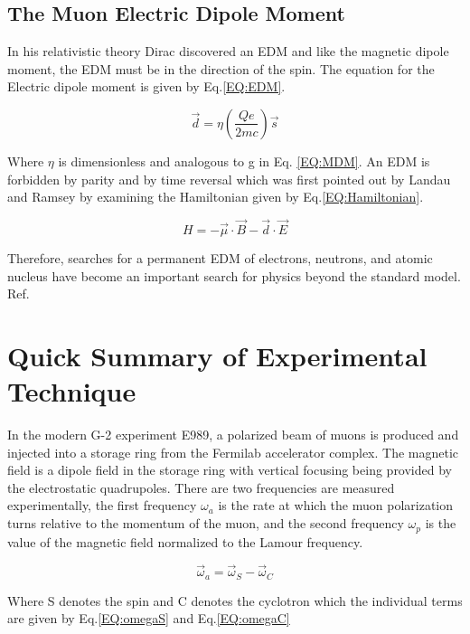 \documentclass[./Thesis]{subfiles}
\begin{document}
\subsection{The Muon Electric Dipole Moment}

	In his relativistic theory Dirac discovered an EDM and like the magnetic dipole moment, the EDM must be in the direction of the spin.  The equation for the Electric dipole moment is given by Eq.\ref{EQ:EDM}.
	
	\begin{equation}\label{EQ:EDM}
		\vec{d} = \eta (\frac{Qe}{2mc}) \vec{s}
	\end{equation}

	Where $\eta$ is dimensionless and analogous to g in Eq. \ref{EQ:MDM}.  An EDM is forbidden by parity and by time reversal which was first pointed out by Landau and Ramsey by examining the Hamiltonian given by Eq.\ref{EQ:Hamiltonian}. \cite{Landau}
	
	\begin{equation}\label{EQ:Hamiltonian}
	H = -\vec{\mu} \cdot \vec{B} - \vec{d} \cdot \vec{E}
	\end{equation}
	
Therefore, searches for a permanent EDM of electrons, neutrons, and atomic nucleus have become an important search for physics beyond the standard model.  Ref.\cite{TDR}

\section{Quick Summary of Experimental Technique}

	In the modern G-2 experiment E989, a polarized beam of muons is produced and injected into a storage ring from the Fermilab accelerator complex.  The magnetic field is a dipole field in the storage ring with vertical focusing being provided by the electrostatic quadrupoles.  There are two frequencies are measured experimentally, the first frequency $\omega_{a}$ is the rate at which the muon polarization turns relative to the momentum of the muon, and the second frequency $\omega_p$ is the value of the magnetic field normalized to the Lamour frequency.
	
	\begin{equation}
	\vec{\omega}_{a} = \vec{\omega}_{S} - \vec{\omega}_{C}
	\end{equation}

Where S denotes the spin and C denotes the cyclotron which the individual terms are given by Eq.\ref{EQ:omegaS} and Eq.\ref{EQ:omegaC}
\end{document}
